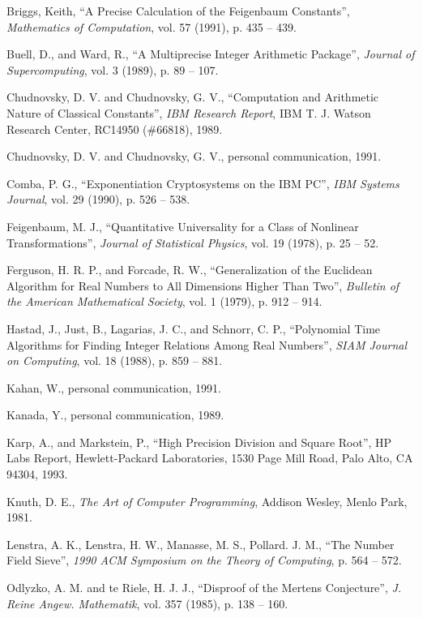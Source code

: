 \begin{thebibliography}{25}
 Briggs, Keith, ``A Precise Calculation of the
Feigenbaum Constants'', {\sl Mathematics of Computation}, vol. 57
(1991), p. 435 -- 439.

 Buell, D., and Ward, R., ``A Multiprecise Integer
Arithmetic Package'', {\sl Journal of Supercomputing}, vol. 3 (1989),
p. 89 -- 107.

 Chudnovsky, D. V. and Chudnovsky, G. V., ``Computation
and Arithmetic Nature of Classical Constants'', {\sl IBM Research
Report}, IBM T. J. Watson Research Center, RC14950 (\#66818), 1989.

 Chudnovsky, D. V. and Chudnovsky, G. V., personal
communication, 1991.

 Comba, P. G., ``Exponentiation Cryptosystems on the
IBM PC'', {\sl IBM Systems Journal}, vol. 29 (1990), p. 526 -- 538.

 Feigenbaum, M. J., ``Quantitative Universality for a
Class of Nonlinear Transformations'', {\sl Journal of Statistical
Physics}, vol. 19 (1978), p. 25 -- 52.

 Ferguson, H. R. P., and Forcade, R. W.,
``Generalization of the Euclidean Algorithm for Real Numbers to All
Dimensions Higher Than Two'', {\sl Bulletin of the American
Mathematical Society}, vol. 1 (1979), p. 912 -- 914.

 Hastad, J., Just, B., Lagarias, J. C., and Schnorr, C.
P., ``Polynomial Time Algorithms for Finding Integer Relations Among
Real Numbers'', {\sl SIAM Journal on Computing}, vol. 18 (1988), p.
859 -- 881.

 Kahan, W., personal communication, 1991.

 Kanada, Y., personal communication, 1989.

 Karp, A., and Markstein, P., ``High Precision Division
and Square Root'', HP Labs Report, Hewlett-Packard Laboratories, 1530
Page Mill Road, Palo Alto, CA 94304, 1993.

 Knuth, D. E., {\sl The Art of Computer Programming},
Addison Wesley, Menlo Park, 1981.

 Lenstra, A. K., Lenstra, H. W., Manasse, M. S.,
Pollard. J. M., ``The Number Field Sieve'', {\sl 1990 ACM Symposium on
the Theory of Computing}, p. 564 -- 572.

 Odlyzko, A. M. and te Riele, H. J. J., ``Disproof of
the Mertens Conjecture'', {\sl J. Reine Angew. Mathematik}, vol. 357
(1985), p.  138 -- 160.


\end{thebibliography}
